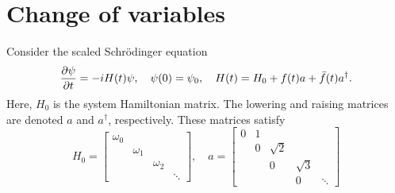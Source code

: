 \documentclass[11pt]{article}
\begin{document}



\section{Change of variables}
Consider the scaled Schr\"odinger equation
\begin{equation}\label{eq_shrodinger}
\frac{\partial \psi}{\partial t} = -i H(t) \psi,\quad \psi(0) = \psi_0,\quad H(t) = H_0 + f(t)a + \bar{f}(t)a^\dag.
\end{equation}
Here, $H_0$ is the system Hamiltonian matrix. The lowering and raising matrices are denoted $a$ and
$a^\dag$, respectively. These matrices satisfy
\begin{equation}\label{eq_matrices}
H_0=\begin{bmatrix}
\omega_0 & & &\\
& \omega_1 &&\\
& & \omega_2 &\\
& & & \ddots
\end{bmatrix},\quad
%
a = \begin{bmatrix}
0 & 1 & & &\\
 & 0 & \sqrt{2} & &\\
&  & 0 & \sqrt{3} &\\
& &  & 0 & \ddots
\end{bmatrix}
\end{equation}

\end{document}
